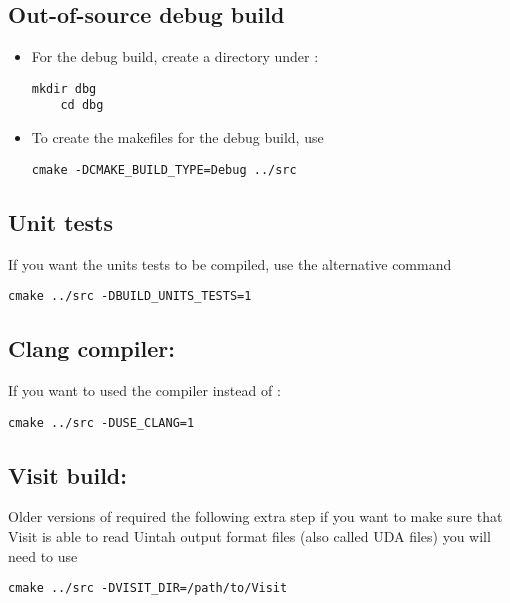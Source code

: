\documentclass[11pt,fleqn]{book} %
\begin{document}
\subsection{ Out-of-source debug build}
\begin{itemize}
 \item For the debug build, create a directory  under :

\begin{lstlisting}[backgroundcolor=\color{background}]
    mkdir dbg
    cd dbg
\end{lstlisting}

 \item To create the makefiles for the debug build, use

\begin{lstlisting}[backgroundcolor=\color{background}]
    cmake -DCMAKE_BUILD_TYPE=Debug ../src
\end{lstlisting}

\end{itemize}

\subsection{ Unit tests}
If you want the units tests to be compiled, use the alternative command

\begin{lstlisting}[backgroundcolor=\color{background}]
    cmake ../src -DBUILD_UNITS_TESTS=1
\end{lstlisting}

\subsection{ Clang compiler:}
If you want to used the  compiler instead of :

\begin{lstlisting}[backgroundcolor=\color{background}]
    cmake ../src -DUSE_CLANG=1
\end{lstlisting}

\subsection{ Visit build:}
Older versions of  required the following extra step if you want to make sure that Visit is able to read Uintah output format files (also called UDA files) you will need to use

\begin{lstlisting}[backgroundcolor=\color{background}]
   cmake ../src -DVISIT_DIR=/path/to/Visit
\end{lstlisting}
\end{document}
